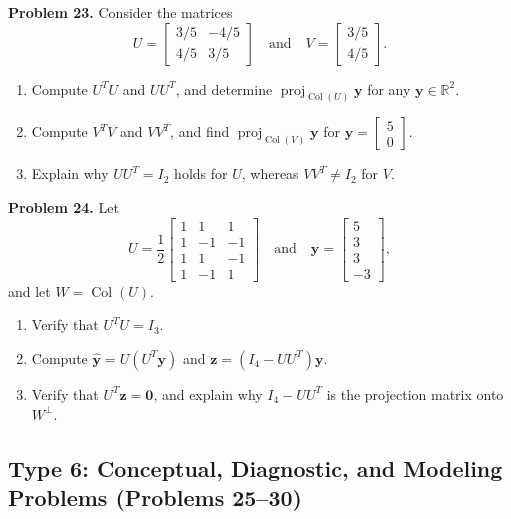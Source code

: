 \documentclass[11pt, letterpaper]{article}
\theoremstyle{definition}
\theoremstyle{remark}
\newcommand{\R}{\mathbb{R}}
\begin{document}
\textbf{Problem 23.} Consider the matrices
\[
U = \begin{bmatrix} 3/5 & -4/5 \\ 4/5 & 3/5 \end{bmatrix} \quad \text{and} \quad V = \begin{bmatrix} 3/5 \\ 4/5 \end{bmatrix}.
\]
\begin{enumerate}[label=(\alph*)]
    \item Compute $U^T U$ and $UU^T$, and determine $\operatorname{proj}_{\operatorname{Col}(U)} \mathbf{y}$ for any $\mathbf{y} \in \R^2$.
    \item Compute $V^T V$ and $VV^T$, and find $\operatorname{proj}_{\operatorname{Col}(V)} \mathbf{y}$ for $\mathbf{y} = \begin{bmatrix} 5 \\ 0 \end{bmatrix}$.
    \item Explain why $UU^T = I_2$ holds for $U$, whereas $VV^T \neq I_2$ for $V$.
\end{enumerate}

\textbf{Problem 24.} Let
\[
U = \frac{1}{2}\begin{bmatrix} 1 & 1 & 1 \\ 1 & -1 & -1 \\ 1 & 1 & -1 \\ 1 & -1 & 1 \end{bmatrix} \quad \text{and} \quad \mathbf{y} = \begin{bmatrix} 5 \\ 3 \\ 3 \\ -3 \end{bmatrix},
\]
and let $W = \operatorname{Col}(U)$.
\begin{enumerate}[label=(\alph*)]
    \item Verify that $U^T U = I_3$.
    \item Compute $\hat{\mathbf{y}} = U(U^T \mathbf{y})$ and $\mathbf{z} = (I_4 - UU^T)\mathbf{y}$.
    \item Verify that $U^T \mathbf{z} = \mathbf{0}$, and explain why $I_4 - UU^T$ is the projection matrix onto $W^\perp$.
\end{enumerate}

\subsection{Type 6: Conceptual, Diagnostic, and Modeling Problems (Problems 25--30)}
\end{document}
